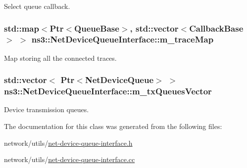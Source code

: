 Select queue callback. 

\subsubsection[{\texorpdfstring{m\+\_\+trace\+Map}{m_traceMap}}]{\setlength{\rightskip}{0pt plus 5cm}std\+::map$<${\bf Ptr}$<${\bf Queue\+Base}$>$, std\+::vector$<${\bf Callback\+Base}$>$ $>$ ns3\+::\+Net\+Device\+Queue\+Interface\+::m\+\_\+trace\+Map\hspace{0.3cm}{\ttfamily [private]}}\hypertarget{classns3_1_1NetDeviceQueueInterface_acb9b194cfebe060d435263b240ea8cea}{}\label{classns3_1_1NetDeviceQueueInterface_acb9b194cfebe060d435263b240ea8cea}


Map storing all the connected traces. 

\subsubsection[{\texorpdfstring{m\+\_\+tx\+Queues\+Vector}{m_txQueuesVector}}]{\setlength{\rightskip}{0pt plus 5cm}std\+::vector$<$ {\bf Ptr}$<${\bf Net\+Device\+Queue}$>$ $>$ ns3\+::\+Net\+Device\+Queue\+Interface\+::m\+\_\+tx\+Queues\+Vector\hspace{0.3cm}{\ttfamily [private]}}\hypertarget{classns3_1_1NetDeviceQueueInterface_a3664353bc54f4e8d588ba47314ad4889}{}\label{classns3_1_1NetDeviceQueueInterface_a3664353bc54f4e8d588ba47314ad4889}


Device transmission queues. 



The documentation for this class was generated from the following files\+:\begin{DoxyCompactItemize}
\item 
network/utils/\hyperlink{net-device-queue-interface_8h}{net-\/device-\/queue-\/interface.\+h}\item 
network/utils/\hyperlink{net-device-queue-interface_8cc}{net-\/device-\/queue-\/interface.\+cc}\end{DoxyCompactItemize}
